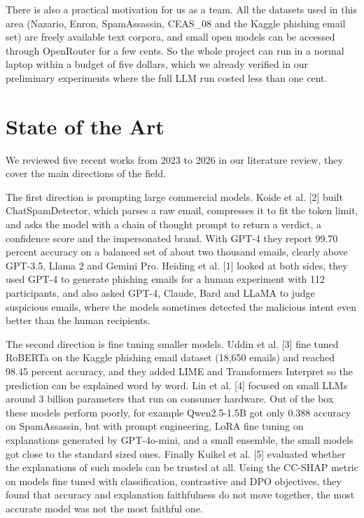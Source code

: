 \documentclass[11pt,a4paper]{article}
\begin{document}
There is also a practical motivation for us as a team. All the datasets used in this area (Nazario, Enron, SpamAssassin, CEAS\_08 and the Kaggle phishing email set) are freely available text corpora, and small open models can be accessed through OpenRouter for a few cents. So the whole project can run in a normal laptop within a budget of five dollars, which we already verified in our preliminary experiments where the full LLM run costed less than one cent.

\section{State of the Art}

We reviewed five recent works from 2023 to 2026 in our literature review, they cover the main directions of the field.

The first direction is prompting large commercial models. Koide et al. [2] built ChatSpamDetector, which parses a raw email, compresses it to fit the token limit, and asks the model with a chain of thought prompt to return a verdict, a confidence score and the impersonated brand. With GPT-4 they report 99.70 percent accuracy on a balanced set of about two thousand emails, clearly above GPT-3.5, Llama 2 and Gemini Pro. Heiding et al. [1] looked at both sides, they used GPT-4 to generate phishing emails for a human experiment with 112 participants, and also asked GPT-4, Claude, Bard and LLaMA to judge suspicious emails, where the models sometimes detected the malicious intent even better than the human recipients.

The second direction is fine tuning smaller models. Uddin et al. [3] fine tuned RoBERTa on the Kaggle phishing email dataset (18,650 emails) and reached 98.45 percent accuracy, and they added LIME and Transformers Interpret so the prediction can be explained word by word. Lin et al. [4] focused on small LLMs around 3 billion parameters that run on consumer hardware. Out of the box these models perform poorly, for example Qwen2.5-1.5B got only 0.388 accuracy on SpamAssassin, but with prompt engineering, LoRA fine tuning on explanations generated by GPT-4o-mini, and a small ensemble, the small models got close to the standard sized ones. Finally Kuikel et al. [5] evaluated whether the explanations of such models can be trusted at all. Using the CC-SHAP metric on models fine tuned with classification, contrastive and DPO objectives, they found that accuracy and explanation faithfulness do not move together, the most accurate model was not the most faithful one.
\end{document}
